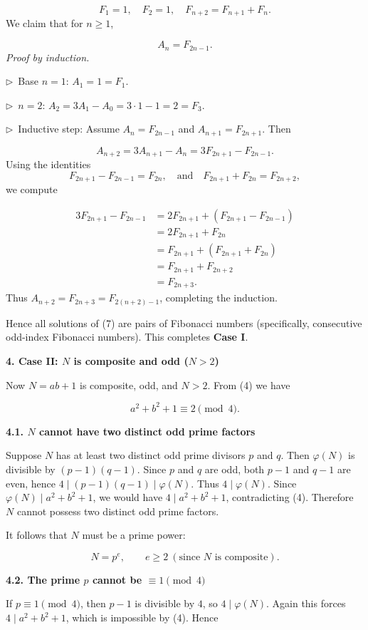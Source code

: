 \documentclass{llmxive}
\providecommand{\solutionheading}[1]{\par\smallskip\noindent\textbf{#1}\par}
\providecommand{\compactbullet}[1]{\par\noindent$\triangleright$~#1\par}
\begin{document}
\[
F_1 = 1,\quad F_2 = 1,\quad F_{n+2} = F_{n+1} + F_n.
\]
We claim that for \(n \ge 1\),\par
\[
A_n = F_{2n-1}.
\]
\emph{Proof by induction.}\par
\compactbullet{Base \(n=1\): \(A_1 = 1 = F_1\).}
\compactbullet{\(n=2\): \(A_2 = 3A_1 - A_0 = 3\cdot1 - 1 = 2 = F_3\).}
\compactbullet{Inductive step: Assume \(A_n = F_{2n-1}\) and \(A_{n+1} = F_{2n+1}\). Then}
\[
A_{n+2} = 3A_{n+1} - A_n = 3F_{2n+1} - F_{2n-1}.
\]
Using the identities
\[
F_{2n+1} - F_{2n-1} = F_{2n},\quad \text{and}\quad F_{2n+1} + F_{2n} = F_{2n+2},
\]
we compute\par
\[
\begin{aligned}
3F_{2n+1} - F_{2n-1} &= 2F_{2n+1} + (F_{2n+1} - F_{2n-1}) \\
&= 2F_{2n+1} + F_{2n} \\
&= F_{2n+1} + (F_{2n+1} + F_{2n}) \\
&= F_{2n+1} + F_{2n+2} \\
&= F_{2n+3}.
\end{aligned}
\]
Thus \(A_{n+2} = F_{2n+3} = F_{2(n+2)-1}\), completing the induction.\par
Hence all solutions of (7) are pairs of Fibonacci numbers (specifically, consecutive odd-index Fibonacci numbers). This completes \textbf{Case I}.\par
\smallskip
\solutionheading{4. Case II: \(N\) is composite and odd (\(N>2\))}
Now \(N = ab+1\) is composite, odd, and \(N>2\). From (4) we have\par
\[
a^{2}+b^{2}+1 \equiv 2 \pmod{4}.
\]
\solutionheading{4.1. \(N\) cannot have two distinct odd prime factors}
Suppose \(N\) has at least two distinct odd prime divisors \(p\) and \(q\). Then \(\varphi(N)\) is divisible by \((p-1)(q-1)\). Since \(p\) and \(q\) are odd, both \(p-1\) and \(q-1\) are even, hence \(4 \mid (p-1)(q-1) \mid \varphi(N)\). Thus \(4 \mid \varphi(N)\). Since \(\varphi(N) \mid a^{2}+b^{2}+1\), we would have \(4 \mid a^{2}+b^{2}+1\), contradicting (4). Therefore \(N\) cannot possess two distinct odd prime factors.\par
It follows that \(N\) must be a prime power:\par
\[
N = p^{e}, \qquad e \ge 2\ (\text{since } N \text{ is composite}).
\]
\solutionheading{4.2. The prime \(p\) cannot be \(\equiv 1 \pmod{4}\)}
If \(p \equiv 1 \pmod{4}\), then \(p-1\) is divisible by \(4\), so \(4 \mid \varphi(N)\). Again this forces \(4 \mid a^{2}+b^{2}+1\), which is impossible by (4). Hence\par
\end{document}
